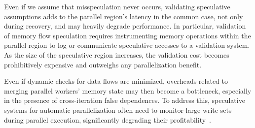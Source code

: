 Even if we assume that misspeculation never occurs, validating speculative
assumptions adds to the parallel region's latency in the common case, not only
during recovery, and may heavily degrade performance.
%
In particular, validation of memory flow speculation requires instrumenting
memory operations within the parallel region to log or communicate speculative
accesses to a validation system. As the size of the speculative region
increases, the validation cost becomes prohibitively expensive and outweighs any
parallelization benefit.
%

Even if dynamic checks for data flows are minimized, overheads related to
merging parallel workers' memory state
may then become a bottleneck,
%
especially in the presence of cross-iteration false dependences.
%
To address this, speculative systems for automatic parallelization often need to
monitor large write sets during parallel execution, significantly degrading
their profitability~\cite{johnson:12:pldi}.
%
%
%
%

%
%

